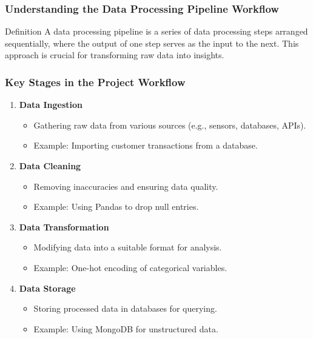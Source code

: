 \documentclass[aspectratio=169]{beamer}
\begin{document}
\begin{frame}[fragile]
    \frametitle{Understanding the Data Processing Pipeline Workflow}
    \begin{block}{Definition}
        A data processing pipeline is a series of data processing steps arranged sequentially, where the output of one step serves as the input to the next. This approach is crucial for transforming raw data into insights.
    \end{block}
\end{frame}

\begin{frame}[fragile]
    \frametitle{Key Stages in the Project Workflow}
    \begin{enumerate}
        \item \textbf{Data Ingestion}
            \begin{itemize}
                \item Gathering raw data from various sources (e.g., sensors, databases, APIs).
                \item Example: Importing customer transactions from a database.
            \end{itemize}
        \item \textbf{Data Cleaning}
            \begin{itemize}
                \item Removing inaccuracies and ensuring data quality.
                \item Example: Using Pandas to drop null entries.
            \end{itemize}
        \item \textbf{Data Transformation}
            \begin{itemize}
                \item Modifying data into a suitable format for analysis.
                \item Example: One-hot encoding of categorical variables.
            \end{itemize}
        \item \textbf{Data Storage}
            \begin{itemize}
                \item Storing processed data in databases for querying.
                \item Example: Using MongoDB for unstructured data.
            \end{itemize}
    \end{enumerate}
\end{frame}
\end{document}
